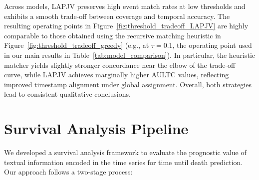Across models, LAPJV preserves high event match rates at low thresholds and exhibits a
smooth trade-off between coverage and temporal accuracy. 
The resulting operating points in Figure~\ref{fig:threshold_tradeoff_LAPJV}
are highly comparable to those obtained using the recursive matching heuristic in Figure~\ref{fig:threshold_tradeoff_greedy} (e.g., at $\tau=0.1$, the operating point used in our main results in Table~\ref{tab:model_comparison}). 
In particular,
the heuristic matcher yields slightly stronger concordance near the elbow of the trade-off
curve, while LAPJV achieves marginally higher AULTC values, reflecting improved timestamp
alignment under global assignment. 
Overall, both strategies lead to consistent qualitative
conclusions.





\section{Survival Analysis Pipeline}
\label{apd:survival-analysis-pipeline}

We developed a survival analysis framework to evaluate the prognostic value of textual information encoded in the time series for time until death prediction. 
Our approach follows a two-stage process:


